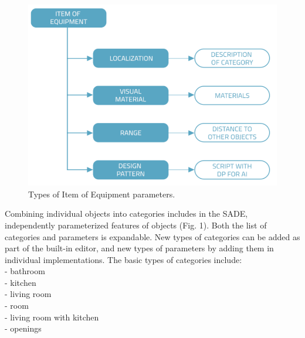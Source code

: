\documentclass[runningheads]{llncs}
\begin{document}
\begin{figure}[H]
\centering
\includegraphics[width=\textwidth]{graf.png}
\caption{Types of Item of Equipment parameters.} \label{fig1}
\end{figure}

Combining individual objects into categories includes in the SADE, independently parameterized features of objects (Fig. 1). Both the list of categories and parameters is expandable. New types of categories can be added as part of the built-in editor, and new types of parameters by adding them in individual implementations.
The basic types of categories include:\\
- bathroom\\
- kitchen\\
- living room\\
- room\\
- living room with kitchen\\
- openings\\
\end{document}
